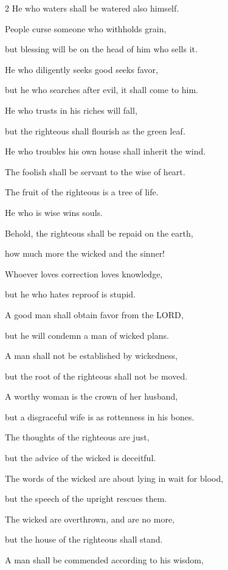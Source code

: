 \begin{multicols}{2}
He who waters shall be watered also himself.


\myverse{}People curse someone who withholds grain,

but blessing will be on the head of him who sells it.


\myverse{}He who diligently seeks good seeks favor,

but he who searches after evil, it shall come to him.


\myverse{}He who trusts in his riches will fall,

but the righteous shall flourish as the green leaf.


\myverse{}He who troubles his own house shall inherit the wind.

The foolish shall be servant to the wise of heart.


\myverse{}The fruit of the righteous is a tree of life.

He who is wise wins souls.


\myverse{}Behold, the righteous shall be repaid on the earth,

how much more the wicked and the sinner!


\mychapter{} \myverse*{}Whoever loves correction loves knowledge,

\quad\quad but he who hates reproof is stupid.


\myverse{}A good man shall obtain favor from the LORD,

but he will condemn a man of wicked plans.


\myverse{}A man shall not be established by wickedness,

but the root of the righteous shall not be moved.


\myverse{}A worthy woman is the crown of her husband,

but a disgraceful wife is as rottenness in his bones.


\myverse{}The thoughts of the righteous are just,

but the advice of the wicked is deceitful.


\myverse{}The words of the wicked are about lying in wait for blood,

but the speech of the upright rescues them.


\myverse{}The wicked are overthrown, and are no more,

but the house of the righteous shall stand.


\myverse{}A man shall be commended according to his wisdom,


\end{multicols}
